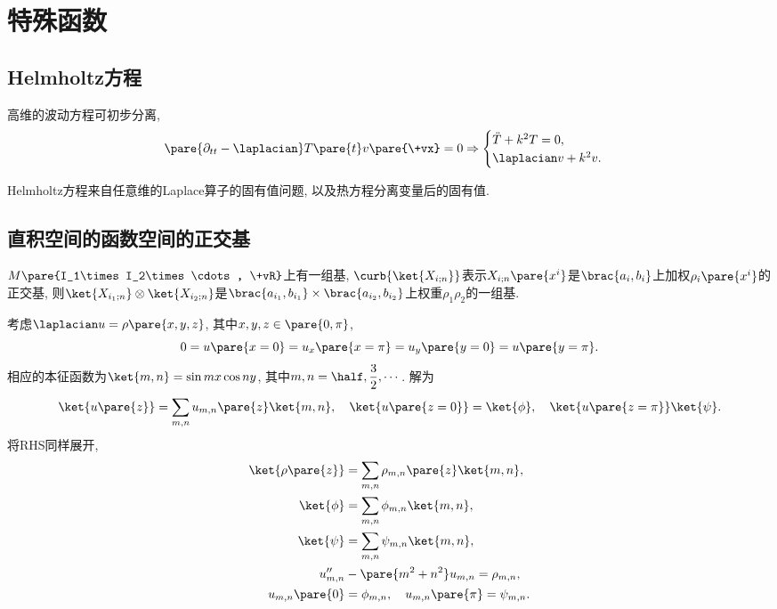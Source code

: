 \documentclass[hidelinks]{ctexart}
\begin{document}
\section{特殊函数} %
\label{sec:特殊函数}

\subsection{Helmholtz方程} %
\label{sub:helmholtz方程}

高维的波动方程可初步分离,
\[ \pare{\partial_{tt} - \laplacian} T\pare{t}v\pare{\+vx} = 0 \Rightarrow \begin{cases}
    \ddot{T} + k^2 T = 0, \\
    \laplacian v + k^2 v.
\end{cases} \]
\begin{remark}
    Helmholtz方程来自任意维的Laplace算子的固有值问题, 以及热方程分离变量后的固有值.
\end{remark}


\subsection{直积空间的函数空间的正交基} %
\label{sub:直积空间的函数空间的正交基}

$M\pare{I_1\times I_2\times\cdots, \+vR}$上有一组基, $\curb{\ket{X_{i;n}}}$表示$X_{i;n}\pare{x^i}$是$\brac{a_i,b_i}$上加权$\rho_i\pare{x^i}$的正交基, 则$\ket{X_{i_1;n}}\otimes \ket{X_{i_2;n}}$是$\brac{a_{i_1},b_{i_1}}\times \brac{a_{i_2},b_{i_2}}$上权重$\rho_1\rho_2$的一组基.
\begin{ex}
    考虑$\laplacian u = \rho\pare{x,y,z}$, 其中$x,y,z\in \pare{0,\pi}$,
    \[ 0 = u\pare{x=0} = u_x\pare{x=\pi} = u_y\pare{y=0} = u\pare{y=\pi}. \]
    相应的本征函数为$\ket{m,n} = \sin mx \cos ny$, 其中$\displaystyle m,n = \half, \frac{3}{2},\cdots$.
    解为
    \[ \ket{u\pare{z}} = \sum_{m,n} u_{m,n}\pare{z} \ket{m,n},\quad \ket{u\pare{z=0}} = \ket{\phi},\quad \ket{u\pare{z=\pi}} \ket{\psi}. \]
    将RHS同样展开,
    \begin{align*}
        \ket{\rho\pare{z}} &= \sum_{m,n} \rho_{m,n}\pare{z} \ket{m,n}, \\
        \ket{\phi} &= \sum_{m,n} \phi_{m,n}\ket{m,n}, \\
        \ket{\psi} &= \sum_{m,n} \psi_{m,n}\ket{m,n}, \\
        u''_{m,n} &- \pare{m^2+n^2}u_{m,n} = \rho_{m,n}, \\
        u_{m,n}\pare{0} &= \phi_{m,n},\quad u_{m,n}\pare{\pi} = \psi_{m,n}.
    \end{align*}
\end{ex}
\end{document}
